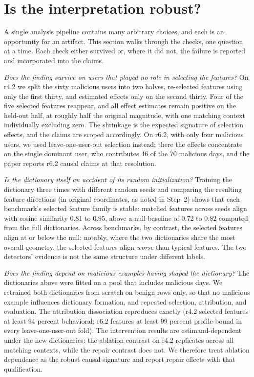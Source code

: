 \documentclass[10pt]{article}
\begin{document}
\section{Is the interpretation robust?}
\label{sec:robustness}

A single analysis pipeline contains many arbitrary choices, and each is
an opportunity for an artifact. This section walks through the checks,
one question at a time. Each check either survived or, where it did
not, the failure is reported and incorporated into the claims.

\emph{Does the finding survive on users that played no role in
selecting the features?} On r4.2 we split the sixty malicious users
into two halves, re-selected features using only the first thirty, and
estimated effects only on the second thirty. Four of the five selected
features reappear, and all effect estimates remain positive on the
held-out half, at roughly half the original magnitude, with one
matching context individually excluding zero. The shrinkage is the
expected signature of selection effects, and the claims are scoped
accordingly. On r6.2, with only four malicious users, we used
leave-one-user-out selection instead; there the effects concentrate on
the single dominant user, who contributes $46$ of the $70$ malicious
days, and the paper reports r6.2 causal claims at that resolution.

\emph{Is the dictionary itself an accident of its random
initialization?} Training the dictionary three times with different
random seeds and comparing the resulting feature directions (in
original coordinates, as noted in Step~2) shows that each benchmark's
selected feature family is stable: matched features across seeds align
with cosine similarity $0.81$ to $0.95$, above a null baseline of
$0.72$ to $0.82$ computed from the full dictionaries. Across
benchmarks, by contrast, the selected features align at or below the
null; notably, where the two dictionaries share the most overall
geometry, the selected features align \emph{worse} than typical
features. The two detectors' evidence is not the same structure under
different labels.

\emph{Does the finding depend on malicious examples having shaped the
dictionary?} The dictionaries above were fitted on a pool that includes
malicious days. We retrained both dictionaries from scratch on benign
rows only, so that no malicious example influences dictionary
formation, and repeated selection, attribution, and evaluation. The
attribution dissociation reproduces exactly (r4.2 selected features at
least $94$ percent behavioral; r6.2 features at least $99$ percent
profile-bound in every leave-one-user-out fold). The intervention
results are estimand-dependent under the new dictionaries: the ablation
contrast on r4.2 replicates across all matching contexts, while the
repair contrast does not. We therefore treat ablation dependence as the
robust causal signature and report repair effects with that
qualification.
\end{document}
